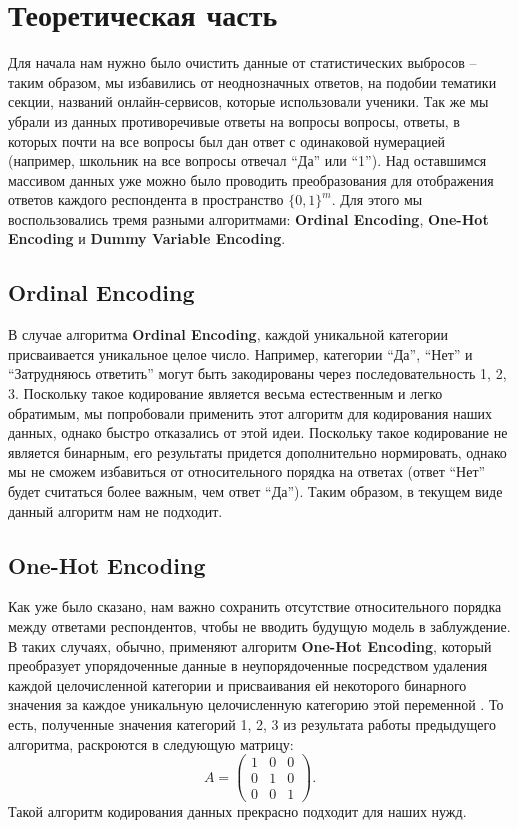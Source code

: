 \section{Теоретическая часть} \label{sec:theory}
Для начала нам нужно было очистить данные от статистических выбросов -- таким образом, мы избавились от неоднозначных ответов, на подобии тематики секции, названий онлайн-сервисов, которые использовали ученики. 
Так же мы убрали из данных противоречивые ответы на вопросы вопросы, ответы, в которых почти на все вопросы был дан ответ с одинаковой нумерацией (например, школьник на все вопросы отвечал \enquote{Да} или \enquote{1}). 
Над оставшимся массивом данных уже можно было проводить преобразования для отображения ответов каждого респондента в пространство $\{0, 1\}^{m}$. 
Для этого мы воспользовались тремя разными алгоритмами: {\bf Ordinal Encoding}, {\bf One-Hot Encoding} и {\bf Dummy Variable Encoding}.
\subsection{Ordinal Encoding}

В случае алгоритма {\bf Ordinal Encoding}, каждой уникальной категории присваивается уникальное целое число.
Например, категории \enquote{Да}, \enquote{Нет} и \enquote{Затрудняюсь ответить} могут быть закодированы через последовательность 1, 2, 3.
Поскольку такое кодирование является весьма естественным и легко обратимым, мы попробовали применить этот алгоритм для кодирования наших данных, однако быстро отказались от этой идеи.
Поскольку такое кодирование не является бинарным, его результаты придется дополнительно нормировать, однако мы не сможем избавиться от относительного порядка на ответах (ответ \enquote{Нет} будет считаться более важным, чем ответ \enquote{Да}).
Таким образом, в текущем виде данный алгоритм нам не подходит.

\subsection{One-Hot Encoding}

Как уже было сказано, нам важно сохранить отсутствие относительного порядка между ответами респондентов, чтобы не вводить будущую модель в заблуждение.
В таких случаях, обычно, применяют алгоритм {\bf One-Hot Encoding}, который преобразует упорядоченные данные в неупорядоченные посредством удаления каждой целочисленной категории и присваивания ей некоторого бинарного значения за каждое уникальную целочисленную категорию этой переменной \cite{feature-eng}.
То есть, полученные значения категорий 1, 2, 3 из результата работы предыдущего алгоритма, раскроются в следующую матрицу:
\[
    A = \begin{pmatrix}
        1 & 0 & 0 \\
        0 & 1 & 0 \\
        0 & 0 & 1
    \end{pmatrix}.
\]
Такой алгоритм кодирования данных прекрасно подходит для наших нужд.

